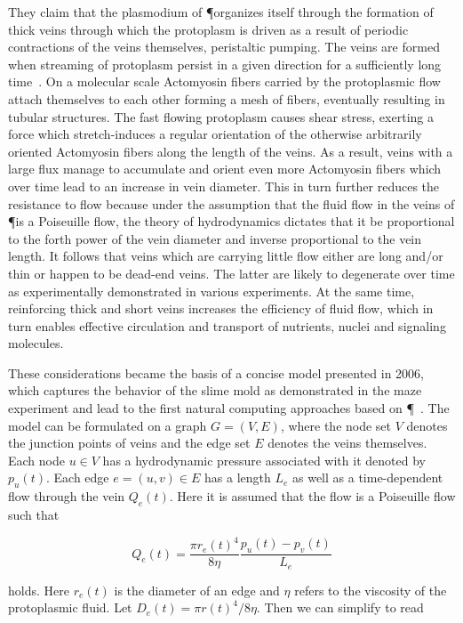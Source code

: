 			They claim that the plasmodium of \P organizes itself through the formation of thick veins through which the protoplasm is driven as a result of periodic contractions of the veins themselves, \ie peristaltic pumping. The veins are formed when streaming of protoplasm persist in a given direction for a sufficiently long time~\cite{nakagaki2000interaction}. On a molecular scale Actomyosin fibers carried by the protoplasmic flow attach themselves to each other forming a mesh of fibers, eventually resulting in tubular structures. The fast flowing protoplasm causes shear stress, exerting a force which stretch-induces a regular orientation of the otherwise arbitrarily oriented Actomyosin fibers along the length of the veins. As a result, veins with a large flux manage to accumulate and orient even more Actomyosin fibers which over time lead to an increase in vein diameter. This in turn further reduces the resistance to flow because under the assumption that the fluid flow in the veins of \P is a Poiseuille flow, the theory of hydrodynamics dictates that it be proportional to the forth power of the vein diameter and inverse proportional to the vein length. It follows that veins which are carrying little flow either are long and/or thin or happen to be dead-end veins. The latter are likely to degenerate over time as experimentally demonstrated in various experiments. At the same time, reinforcing thick and short veins increases the efficiency of fluid flow, which in turn enables effective circulation and transport of nutrients, nuclei and signaling molecules.

			These considerations became the basis of a concise model presented in 2006, which captures the behavior of the slime mold as demonstrated in the maze experiment and lead to the first natural computing approaches based on \P~\cite{Tero2006115}. The model can be formulated on a graph $G = (V,E)$, where the node set $V$ denotes the junction points of veins and the edge set $E$ denotes the veins themselves. Each node $u \in V$ has a hydrodynamic pressure associated with it denoted by $p_u(t)$. Each edge $e = (u,v) \in E$ has a length $L_e$ as well as a time-dependent flow through the vein $Q_e(t)$. Here it is assumed that the flow is a Poiseuille flow such that

			\begin{equation}
				Q_e(t) = \frac{\pi r_e(t)^4}{ 8 \eta} \frac{p_u(t)-p_v(t)}{L_e}
				\label{eq:flow_initial}
			\end{equation}
			
			holds. Here $r_e(t)$ is the diameter of an edge and $\eta$ refers to the viscosity of the protoplasmic fluid. Let $D_e(t) = \pi r(t)^4/ 8 \eta$. Then we can simplify  to read

